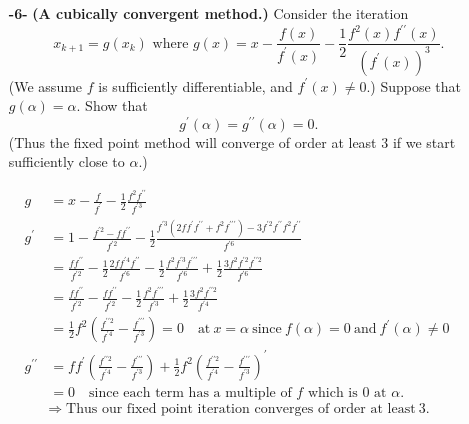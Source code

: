 \documentclass[11pt]{article}
\theoremstyle{definition}
\newcommand{\1}[1]{\mathbf{1} \left \{ #1 \right \}}
\begin{document}
\begin{itemize}
    \item[{\textbf{-6-}}] \textbf{(A cubically convergent method.)}  Consider the iteration
    \begin{equation*}
        x_{k+1} = g(x_k) \text{  where  } g(x) = x - \frac{f(x)}{f^{\prime}(x)} - \frac{1}{2}\frac{f^2 (x) f^{\prime\prime}(x)}{\left(f^{\prime}(x)\right)^3}.
    \end{equation*}
    (We assume $f$ is sufficiently differentiable, and $f^{\prime}(x) \neq 0$.)  Suppose that $g(\alpha) = \alpha$.  Show that
    \[g^{\prime}(\alpha) = g^{\prime\prime}(\alpha) = 0.\]
    (Thus the fixed point method will converge of order at least $3$ if we start sufficiently close to $\alpha$.)
\end{itemize}
\begin{equation*}
    \begin{split}
        g &= x - \frac{f}{f^{\prime}} - \frac{1}{2} \frac{f^2 f^{\prime\prime}}{f^{\prime 3}} \\
        g^{\prime} &= 1 - \frac{f^{\prime 2} - f f^{\prime\prime}}{f^{\prime 2}} - \frac{1}{2} \frac{f^{\prime 3} (2 f f^{\prime} f^{\prime\prime} + f^2 f^{\prime\prime\prime}) - 3 f^{\prime 2} f^{\prime\prime} f^2 f^{\prime\prime}}{f^{\prime 6}} \\
        &= \frac{f f^{\prime\prime}}{f^{\prime2}} - \frac{1}{2} \frac{2ff^{\prime4}f^{\prime\prime}}{f^{\prime 6}} - \frac{1}{2} \frac{f^2 f^{\prime3} f^{\prime\prime\prime}}{f^{\prime 6}} + \frac{1}{2} \frac{3f^2 f^{\prime2} f^{\prime\prime2}}{f^{\prime 6}} \\
        &= \frac{f f^{\prime\prime}}{f^{\prime2}} - \frac{f f^{\prime\prime}}{f^{\prime 2}} - \frac{1}{2} \frac{f^2 f^{\prime\prime\prime}}{f^{\prime 3}} + \frac{1}{2} \frac{3 f^2 f^{\prime\prime2}}{f^{\prime 4}} \\
        &= \frac{1}{2} f^2 \left(\frac{f^{\prime\prime2}}{f^{\prime4}} - \frac{f^{\prime\prime\prime}}{f^{\prime3}}\right) = 0 \quad \text{at} \ x = \alpha \ \text{since} \ f(\alpha) = 0 \ \text{and} \ f^{\prime}(\alpha) \neq 0 \\
        g^{\prime\prime} &= f f^{\prime} \left(\frac{f^{\prime\prime2}}{f^{\prime4}} - \frac{f^{\prime\prime\prime}}{f^{\prime3}}\right) + \frac{1}{2}f^2 \left(\frac{f^{\prime\prime2}}{f^{\prime4}} - \frac{f^{\prime\prime\prime}}{f^{\prime3}}\right)^{\prime} \\
        &= 0 \quad \text{since each term has a multiple of $f$ which is $0$ at } \alpha.
    \end{split}
\end{equation*}
\[\Longrightarrow \text{Thus our fixed point iteration converges of order at least} \ 3.\]
\end{document}
